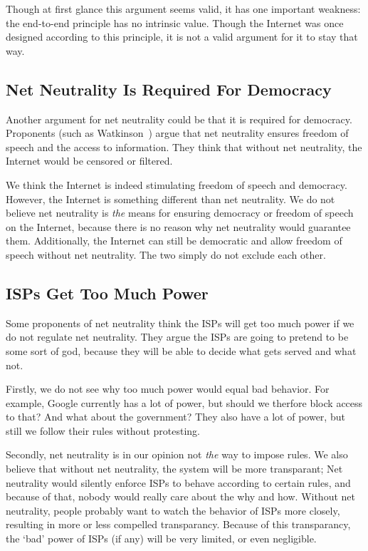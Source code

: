 Though at first glance this argument seems valid, it has one important weakness: the end-to-end principle has no intrinsic value. Though the Internet was once designed according to this principle, it is not a valid argument for it to stay that way.



\subsection{Net Neutrality Is Required For Democracy}
Another argument for net neutrality could be that it is required for democracy.
Proponents (such as Watkinson~\cite{watkinson2012democracy}) argue that net neutrality ensures freedom of speech and the access to information.
They think that without net neutrality, the Internet would be censored or filtered.

We think the Internet is indeed stimulating freedom of speech and democracy.
However, the Internet is something different than net neutrality.
We do not believe net neutrality is \emph{the} means for ensuring democracy or freedom of speech on the Internet, because there is no reason why net neutrality would guarantee them.
Additionally, the Internet can still be democratic and allow freedom of speech without net neutrality.
The two simply do not exclude each other.

\subsection{\acp{ISP} Get Too Much Power}
Some proponents of net neutrality think the \acp{ISP} will get too much power if we do not regulate net neutrality.
They argue the \acp{ISP} are going to pretend to be some sort of god, because they will be able to decide what gets served and what not. %

Firstly, we do not see why too much power would equal bad behavior.
For example, Google currently has a lot of power, but should we therfore block access to that?
And what about the government?
They also have a lot of power, but still we follow their rules without protesting.

Secondly, net neutrality is in our opinion not \emph{the} way to impose rules.
We also believe that without net neutrality, the system will be more transparant;
Net neutrality would silently enforce \acp{ISP} to behave according to certain rules, and because of that, nobody would really care about the why and how.
Without net neutrality, people probably want to watch the behavior of \acp{ISP} more closely, resulting in more or less compelled transparancy.
Because of this transparancy, the `bad' power of \acp{ISP} (if any) will be very limited, or even negligible.

